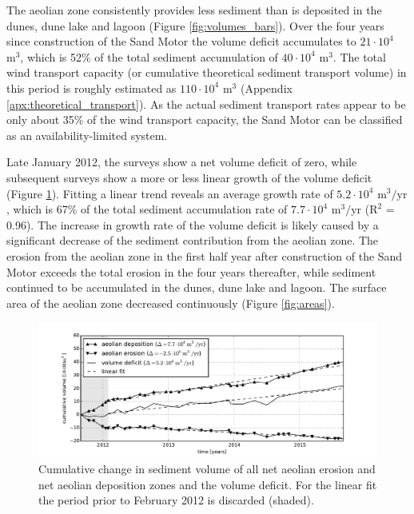 The aeolian zone consistently provides less sediment than is deposited
in the dunes, dune lake and lagoon (Figure
\ref{fig:volumes_bars}). Over the four years since construction of the
Sand Motor the volume deficit accumulates to $\mathrm{21 \cdot 10^4}$
$\mathrm{m^3}$, which is 52\% of the total sediment accumulation of
$\mathrm{40 \cdot 10^4}$ $\mathrm{m^3}$.  The total wind
transport capacity (or cumulative theoretical sediment transport
volume) in this period is roughly estimated as
$\mathrm{110 \cdot 10^4}$ $\mathrm{m^3}$ (Appendix
\ref{apx:theoretical_transport}). As the actual sediment transport
rates appear to be only about 35\% of the wind transport capacity, the
Sand Motor can be classified as an availability-limited system.

Late January 2012, the surveys show a net volume deficit of zero,
while subsequent surveys show a more or less linear growth of the
volume deficit (Figure \ref{fig:netvolumechange}). Fitting a linear
trend reveals an average growth rate of $\mathrm{5.2 \cdot 10^4}$
$\mathrm{m^3/yr}$, which is 67\% of the total sediment accumulation
rate of $\mathrm{7.7 \cdot 10^4}$ $\mathrm{m^3/yr}$ ($\mathrm{R^2}$ =
0.96). The increase in growth rate of the volume deficit is likely
caused by a significant decrease of the sediment contribution from the
aeolian zone. The erosion from the aeolian zone in the first half year
after construction of the Sand Motor exceeds the total erosion in the
four years thereafter, while sediment continued to be accumulated in
the dunes, dune lake and lagoon. The surface area of the aeolian zone
decreased continuously (Figure \ref{fig:areas}).

\begin{figure}
 \centering
  \includegraphics[width=\columnwidth]{../Figures/netvolumechange}
  \caption{Cumulative change in sediment volume of all net aeolian
    erosion and net aeolian deposition zones and the volume
    deficit. For the linear fit the period prior to February 2012 is
    discarded (shaded).}
  \label{fig:netvolumechange}
\end{figure}


